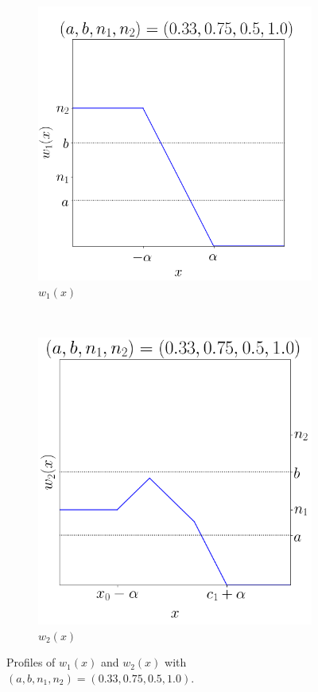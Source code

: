 \documentclass[11pt]{article}
\numberwithin{equation}{section}
\theoremstyle{definition}
\begin{document}
\begin{figure} \label{fig2}
    \centering
    \begin{subfigure}[t]{0.5\textwidth}
        \centering
        \includegraphics[scale=0.25]{fig2a}
        \caption{$w_1(x)$}
    \end{subfigure}%
    ~ 
    \begin{subfigure}[t]{0.5\textwidth}
        \centering
        \includegraphics[scale=0.25]{fig2b}
        \caption{$w_2(x)$}
    \end{subfigure}
    \caption{Profiles of $w_1(x)$ and $w_2(x)$ with $(a,b,n_1,n_2)=(0.33,0.75,0.5,1.0)$.}
    \label{fig:w1andw2}
\end{figure}
\end{document}
